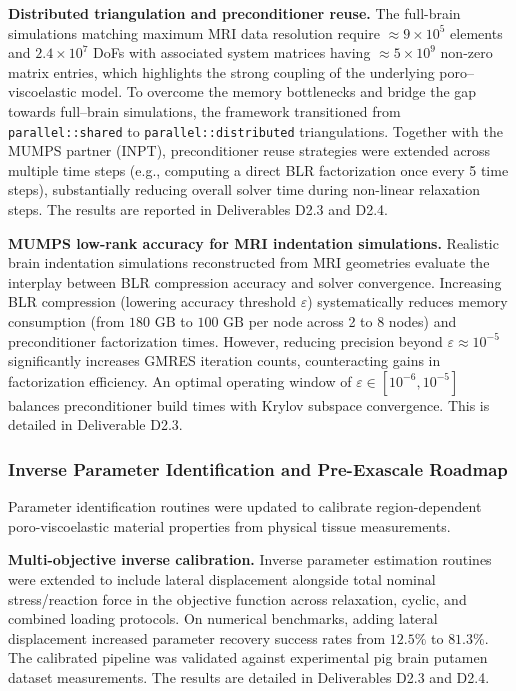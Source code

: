\documentclass[a4paper,12pt, numbers]{article}
\begin{document}
\noindent\textbf{Distributed triangulation and preconditioner reuse.}
The full-brain simulations matching maximum MRI data resolution require $\approx 9 \times 10^5$ elements and $2.4 \times 10^7$ DoFs with associated system matrices having $\approx 5 \times 10^9$ non-zero matrix entries, which highlights the strong coupling of the underlying poro--viscoelastic model. To overcome the memory bottlenecks and bridge the gap towards full--brain simulations, the framework transitioned from \texttt{parallel::shared} to \texttt{parallel::distributed} triangulations. Together with the MUMPS partner (INPT), preconditioner reuse strategies were extended across multiple time steps (e.g., computing a direct BLR factorization once every 5 time steps), substantially reducing overall solver time during non-linear relaxation steps. The results are reported in Deliverables D2.3 and D2.4. 

\noindent\textbf{MUMPS low-rank accuracy for MRI indentation simulations.}
Realistic brain indentation simulations reconstructed from MRI geometries evaluate the interplay between BLR compression accuracy and solver convergence. Increasing BLR compression (lowering accuracy threshold $\varepsilon$) systematically reduces memory consumption (from $180\text{ GB}$ to $100\text{ GB}$ per node across 2 to 8 nodes) and preconditioner factorization times. However, reducing precision beyond $\varepsilon \approx 10^{-5}$ significantly increases GMRES iteration counts, counteracting gains in factorization efficiency. An optimal operating window of $\varepsilon \in [10^{-6}, 10^{-5}]$ balances preconditioner build times with Krylov subspace convergence. This is detailed in Deliverable D2.3.

\subsubsection*{Inverse Parameter Identification and Pre-Exascale Roadmap}

\noindent Parameter identification routines were updated to calibrate region-dependent poro-viscoelastic material properties from physical tissue measurements.

\noindent\textbf{Multi-objective inverse calibration.}
Inverse parameter estimation routines were extended to include lateral displacement alongside total nominal stress/reaction force in the objective function across relaxation, cyclic, and combined loading protocols. On numerical benchmarks, adding lateral displacement increased parameter recovery success rates from $12.5\%$ to $81.3\%$. The calibrated pipeline was validated against experimental pig brain putamen dataset measurements. The results are detailed in Deliverables D2.3 and D2.4.
\end{document}
